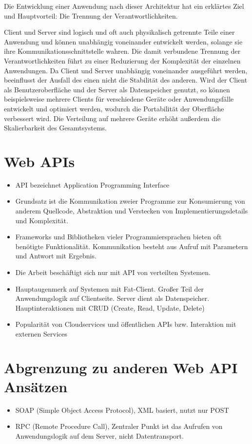 \par
Die Entwicklung einer Anwendung nach dieser Architektur hat ein erklärtes Ziel und Hauptvorteil: Die Trennung der Verantwortlichkeiten.\cite[vgl.][]{REST}
\par
Client und Server sind logisch und oft auch physikalisch getrennte Teile einer Anwendung und können unabhängig voneinander entwickelt werden, solange sie ihre Kommunikationsschnittstelle wahren.
Die damit verbundene Trennung der Verantwortlichkeiten führt zu einer Reduzierung der Komplexität der einzelnen Anwendungen.
Da Client und Server unabhängig voneinander ausgeführt werden, beeinflusst der Ausfall des einen nicht die Stabilität des anderen.
Wird der Client als Benutzeroberfläche und der Server als Datenspeicher genutzt, so können beispielsweise mehrere Clients für verschiedene Geräte oder Anwendungsfälle entwickelt und optimiert werden, wodurch die Portabilität der Oberfläche verbessert wird.
Die Verteilung auf mehrere Geräte erhöht außerdem die Skalierbarkeit des Gesamtsystems.

\section{Web APIs}
\begin{itemize}
  \item API bezeichnet Application Programming Interface
  \item Grundsatz ist die Kommunikation zweier Programme zur Konsumierung von anderem Quellcode, Abstraktion und Verstecken von Implementierungsdetails und Komplexität.
  \item Frameworks und Bibliotheken vieler Programmiersprachen bieten oft benötigte Funktionalität. Kommunikation besteht aus Aufruf mit Parametern und Antwort mit Ergebnis.
  \item Die Arbeit beschäftigt sich nur mit API von verteilten Systemen.
  \item Hauptaugenmerk auf Systemen mit Fat-Client. Großer Teil der Anwendungslogik auf Clientseite. Server dient als Datenspeicher. Hauptinteraktionen mit CRUD (Create, Read, Update, Delete)
  \item Popularität von Cloudservices und öffentlichen APIs bzw. Interaktion mit externen Services
\end{itemize}

\section{Abgrenzung zu anderen Web API Ansätzen}
\begin{itemize}
  \item SOAP (Simple Object Access Protocol), XML basiert, nutzt nur POST
  \item RPC (Remote Procedure Call), Zentraler Punkt ist das Aufrufen von Anwendungslogik auf dem Server, nicht Datentransport.
\end{itemize}
